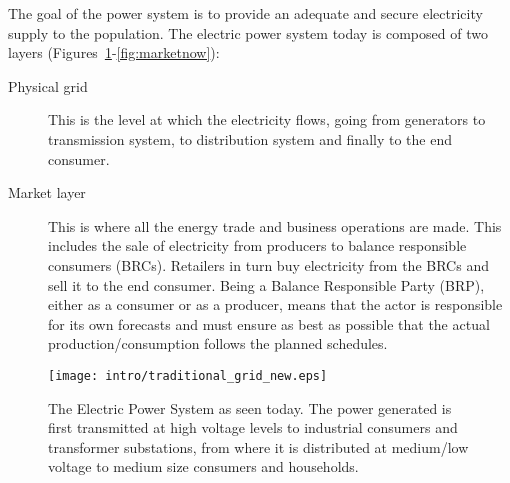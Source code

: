 The goal of the power system is to provide an adequate and secure electricity supply to the population.
The electric power system today is composed of two layers (Figures~\ref{fig:powernow}-\ref{fig:marketnow}): 
\begin{description}
	\item[Physical grid] This is the level at which the electricity flows, going from generators to transmission system, to distribution system and finally to the end consumer.
	\item[Market layer] This is where all the energy trade and business operations are made. This includes the sale of electricity from producers to balance responsible consumers (BRCs). Retailers in turn buy electricity from the BRCs and sell it to the end consumer. Being a Balance Responsible Party (BRP), either as a consumer or as a producer, means that the actor is responsible for its own forecasts and must ensure as best as possible that the actual production/consumption follows the planned schedules.
\end{description}

\begin{figure}[t]
	\centering
	\caption{The Electric Power System as seen today. The power generated is first transmitted at high voltage levels to industrial consumers and transformer substations, from where it is distributed at medium/low voltage to medium size consumers and households.}\label{fig:powernow}
	\texttt{[image: intro/traditional\_grid\_new.eps]}
\end{figure}

